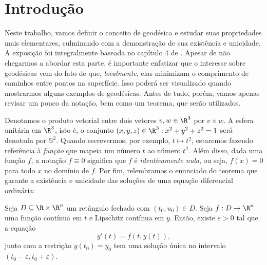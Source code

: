\section{Introdução}

Neste trabalho, vamos definir o conceito de geodésica e estudar suas propriedades mais elementares, culminando com a demonstração de sua existência e unicidade.
A exposição foi integralmente baseada no capítulo 4 de \cite{ronaldo}.
Apesar de não chegarmos a abordar esta parte, é importante enfatizar que o interesse sobre geodésicas vem do fato de que, \emph{localmente}, elas minimizam o comprimento de caminhos entre pontos na superfície.
Isso poderá ser visualizado quando mostrarmos alguns exemplos de geodésicas.
Antes de tudo, porém, vamos apenas revisar um pouco da notação, bem como um teorema, que serão utilizados.

Denotamos o produto vetorial entre dois vetores \( v, w \in \R^{ 3 } \) por \( v \times w \).
A esfera unitária em \( \R^{ 3 } \), isto é, o conjunto \( ( x, y, z ) \in \R^{ 3 } : x^2 + y^2 + z^2 = 1 \) será denotada por \( \mathbb{S}^2 \).
Quando escrevermos, por exemplo, \( t \mapsto t^2 \), estaremos fazendo referência à \emph{função} que mapeia um número \( t \) ao número \( t^2 \).
Além disso, dada uma função \( f \), a notação \( f \equiv 0 \) significa que \( f \) é \emph{identicamente nula}, ou seja, \( f ( x ) = 0 \) para todo \( x \) no domínio de \( f \).
Por fim, relembramos o enunciado do teorema que garante a existência e unicidade das soluções de uma equação diferencial ordinária:
\begin{teo*}
    Seja \( D \subseteq \R \times \R^{ n } \) um retângulo fechado com \( ( t_{ 0 }, u_{ 0 } ) \in D \).
    Seja \( f : D \to \R^{ n } \) uma função contínua em \( t \) e Lipschitz contínua em \( y \).
    Então, existe \( \varepsilon > 0 \) tal que a equação
    \begin{equation*}
        y' ( t ) = f ( t, y ( t ) )
    ,\end{equation*}
    junto com a restrição \( y ( t_{ 0 } ) = y_{ 0 } \) tem uma solução única no intervalo \( ( t_{ 0 } - \varepsilon, t_{ 0 } + \varepsilon ) \).
\end{teo*}


